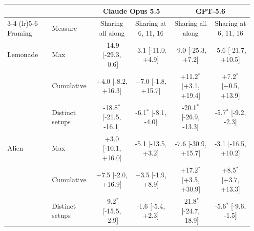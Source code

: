 \begin{tabular}{l l cc cc}
\toprule
 & & \multicolumn{2}{c}{Claude Opus 5.5} & \multicolumn{2}{c}{GPT-5.6} \\
\cmidrule(lr){3-4} \cmidrule(lr){5-6}
Framing & Measure & Sharing all along & Sharing at 6, 11, 16 & Sharing all along & Sharing at 6, 11, 16 \\
\midrule
Lemonade & Max & -14.9 [-29.3, -0.6] & -3.1 [-11.0, +4.9] & -9.0 [-25.3, +7.2] & -5.6 [-21.7, +10.5] \\
 & Cumulative & +4.0 [-8.2, +16.3] & +7.0 [-1.8, +15.7] & +11.2$^{\ast}$ [+3.1, +19.4] & +7.2$^{\ast}$ [+0.5, +13.9] \\
 & Distinct setups & -18.8$^{\ast}$ [-21.5, -16.1] & -6.1$^{\ast}$ [-8.1, -4.0] & -20.1$^{\ast}$ [-26.9, -13.3] & -5.7$^{\ast}$ [-9.2, -2.3] \\
\addlinespace
Alien & Max & +3.0 [-10.1, +16.0] & -5.1 [-13.5, +3.2] & -7.6 [-30.9, +15.7] & -3.1 [-16.5, +10.2] \\
 & Cumulative & +7.5 [-2.0, +16.9] & +3.5 [-1.9, +8.9] & +17.2$^{\ast}$ [+3.5, +30.9] & +8.5$^{\ast}$ [+3.7, +13.3] \\
 & Distinct setups & -9.2$^{\ast}$ [-15.5, -2.9] & -1.6 [-5.4, +2.3] & -21.8$^{\ast}$ [-24.7, -18.9] & -5.6$^{\ast}$ [-9.6, -1.5] \\
\bottomrule
\end{tabular}